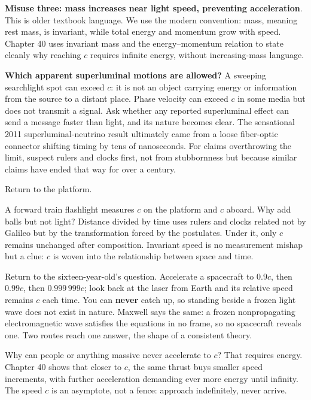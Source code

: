 \textbf{Misuse three: mass increases near light speed, preventing acceleration}. This is older textbook language. We use the modern convention: mass, meaning rest mass, is invariant, while total energy and momentum grow with speed. Chapter 40 uses invariant mass and the energy--momentum relation to state cleanly why reaching \(c\) requires infinite energy, without increasing-mass language.

\textbf{Which apparent superluminal motions are allowed?} A sweeping searchlight spot can exceed \(c\): it is not an object carrying energy or information from the source to a distant place. Phase velocity can exceed \(c\) in some media but does not transmit a signal. Ask whether any reported superluminal effect can send a message faster than light, and its nature becomes clear. The sensational 2011 superluminal-neutrino result ultimately came from a loose fiber-optic connector shifting timing by tens of nanoseconds. For claims overthrowing the limit, suspect rulers and clocks first, not from stubbornness but because similar claims have ended that way for over a century.


Return to the platform.

A forward train flashlight measures \(c\) on the platform and \(c\) aboard. Why add balls but not light? Distance divided by time uses rulers and clocks related not by Galileo but by the transformation forced by the postulates. Under it, only \(c\) remains unchanged after composition. Invariant speed is no measurement mishap but a clue: \(c\) is woven into the relationship between space and time.

Return to the sixteen-year-old's question. Accelerate a spacecraft to \(0.9c\), then \(0.99c\), then \(0.999\,999c\); look back at the laser from Earth and its relative speed remains \(c\) each time. You can \textbf{never} catch up, so standing beside a frozen light wave does not exist in nature. Maxwell says the same: a frozen nonpropagating electromagnetic wave satisfies the equations in no frame, so no spacecraft reveals one. Two routes reach one answer, the shape of a consistent theory.

Why can people or anything massive never accelerate to \(c\)? That requires energy. Chapter 40 shows that closer to \(c\), the same thrust buys smaller speed increments, with further acceleration demanding ever more energy until infinity. The speed \(c\) is an asymptote, not a fence: approach indefinitely, never arrive.

